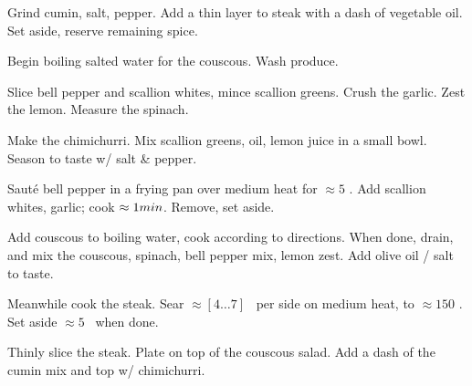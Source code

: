 \begin{preparation}
\item Grind cumin, salt, pepper.
    Add a thin layer to steak with a dash of vegetable oil.
    Set aside, reserve remaining spice.

\item Begin boiling salted water for the couscous.
    Wash produce.

\item Slice bell pepper and scallion whites, mince scallion greens.
    Crush the garlic.
    Zest the lemon.
    Measure the spinach.

\item Make the chimichurri.
    Mix scallion greens, oil, lemon juice in a small bowl.
    Season to taste w/ salt \& pepper.

\item Saut\'{e} bell pepper in a frying pan over medium heat for $\approx 5$ \minute.
    Add scallion whites, garlic; cook $\approx 1 \minute$.
    Remove, set aside.

\item Add couscous to boiling water, cook according to directions.
    When done, drain, and mix the couscous, spinach, bell pepper mix, lemon zest.
    Add olive oil / salt to taste.

\item Meanwhile cook the steak.
    Sear $\approx [4 \dots 7]$ \minute~per side on medium heat, to $\approx 150$ \Fahrenheit.
    Set aside $\approx 5$ \minute~when done.

\item Thinly slice the steak.
    Plate on top of the couscous salad.
    Add a dash of the cumin mix and top w/ chimichurri.
\end{preparation}

\recipeend%
